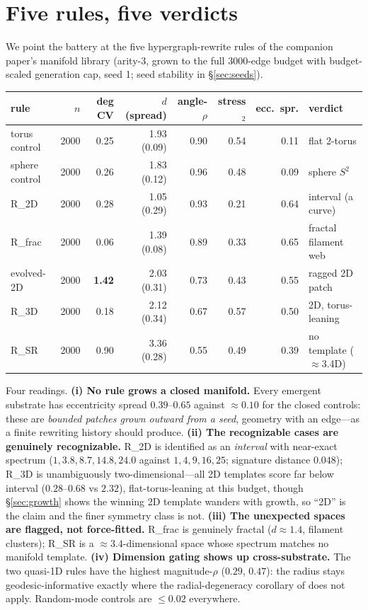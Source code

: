 \documentclass[11pt]{article}
\begin{document}
\section{Five rules, five verdicts}\label{sec:rules}
We point the battery at the five hypergraph-rewrite rules of the companion
paper's manifold library (arity-3, grown to the full 3000-edge budget with
budget-scaled generation cap, seed 1; seed stability in \S\ref{sec:seeds}).

\begin{center}\small
\begin{tabular}{lrrrrrrl}
\toprule
rule & $n$ & deg CV & $d$ (spread) & angle-$\rho$ & stress$_2$ & ecc.\ spr. & verdict \\
\midrule
torus control  & 2000 & 0.25 & 1.93 (0.09) & 0.90 & 0.54 & 0.11 & flat 2-torus \\
sphere control & 2000 & 0.26 & 1.83 (0.12) & 0.96 & 0.48 & 0.09 & sphere $S^2$ \\
\midrule
R\_2D    & 2000 & 0.28 & 1.05 (0.29) & 0.93 & 0.21 & 0.64 & interval (a curve) \\
R\_frac  & 2000 & 0.06 & 1.39 (0.08) & 0.89 & 0.33 & 0.65 & fractal filament web \\
evolved-2D & 2000 & \textbf{1.42} & 2.03 (0.31) & 0.73 & 0.43 & 0.55 & ragged 2D patch \\
R\_3D    & 2000 & 0.18 & 2.12 (0.34) & 0.67 & 0.57 & 0.50 & 2D, torus-leaning \\
R\_SR    & 2000 & 0.90 & 3.36 (0.28) & 0.55 & 0.49 & 0.39 & no template ($\approx$3.4D) \\
\bottomrule
\end{tabular}
\end{center}

Four readings. \textbf{(i) No rule grows a closed manifold.} Every emergent
substrate has eccentricity spread $0.39$--$0.65$ against $\approx0.10$ for the
closed controls: these are \emph{bounded patches grown outward from a seed},
geometry with an edge---as a finite rewriting history should produce.
\textbf{(ii) The recognizable cases are genuinely recognizable.} R\_2D is
identified as an \emph{interval} with near-exact spectrum
($1,3.8,8.7,14.8,24.0$ against $1,4,9,16,25$; signature distance $0.048$);
R\_3D is unambiguously two-dimensional---all 2D templates score far below
interval ($0.28$--$0.68$ vs $2.32$), flat-torus-leaning at this budget,
though \S\ref{sec:growth} shows the winning 2D template wanders with growth,
so ``2D'' is the claim and the finer symmetry class is not.
\textbf{(iii) The unexpected spaces are flagged, not force-fitted.} R\_frac is
genuinely fractal ($d\approx1.4$, filament clusters); R\_SR is a
$\approx3.4$-dimensional space whose spectrum matches no manifold template.
\textbf{(iv) Dimension gating shows up cross-substrate.} The two quasi-1D
rules have the highest magnitude-$\rho$ ($0.29$, $0.47$): the radius stays
geodesic-informative exactly where the radial-degeneracy corollary of
\cite{kta} does not apply. Random-mode controls are $\le0.02$ everywhere.
\end{document}
